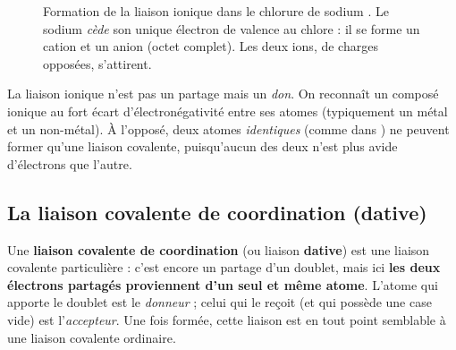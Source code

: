 \documentclass[11pt,a4paper]{article}
\begin{document}
\begin{figure}[h]
\caption{Formation de la liaison ionique dans le chlorure de sodium . Le sodium
\emph{cède} son unique électron de valence au chlore : il se forme un cation  et un
anion  (octet complet). Les deux ions, de charges opposées, s'attirent.}
\label{fig:ionique}
\end{figure}

\begin{attention}
La liaison ionique n'est pas un partage mais un \emph{don}. On reconnaît un composé ionique au
fort écart d'électronégativité entre ses atomes (typiquement un métal et un non-métal). À
l'opposé, deux atomes \emph{identiques} (comme dans ) ne peuvent former qu'une liaison
covalente, puisqu'aucun des deux n'est plus avide d'électrons que l'autre.
\end{attention}

\subsection{La liaison covalente de coordination (dative)}

\begin{definition}
Une \textbf{liaison covalente de coordination} (ou liaison \textbf{dative}) est une liaison
covalente particulière : c'est encore un partage d'un doublet, mais ici \textbf{les deux
électrons partagés proviennent d'un seul et même atome}. L'atome qui apporte le doublet est le
\emph{donneur} ; celui qui le reçoit (et qui possède une case vide) est l'\emph{accepteur}. Une
fois formée, cette liaison est en tout point semblable à une liaison covalente ordinaire.
\end{definition}
\end{document}
